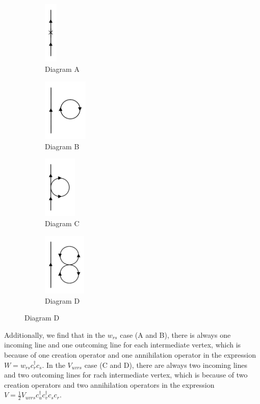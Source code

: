 \begin{figure}[ht]
	\centering
	\begin{subfigure}{0.2\textwidth}
		\centering
		\includegraphics[height=3cm]{figures/diagramA.png}
		\caption{Diagram A}
	\end{subfigure}
	\begin{subfigure}{0.2\textwidth}
		\centering
		\includegraphics[height=3cm]{figures/diagramB.png}
		\caption{Diagram B}
	\end{subfigure}
	\begin{subfigure}{0.2\textwidth}
		\centering
		\includegraphics[height=3cm]{figures/diagramC.png}
		\caption{Diagram C}
	\end{subfigure}
	\begin{subfigure}{0.2\textwidth}
		\centering
		\includegraphics[height=3cm]{figures/diagramD.png}
		\caption{Diagram D}
	\end{subfigure}
\end{figure}

Additionally, we find that in the $w_{rs}$ case (A and B), there is always one incoming line and one outcoming line for each intermediate vertex, which is because of one creation operator and one annihilation operator in the expression $W=w_{rs} c_r^{\dagger} c_s$.
In the $V_{uvrs}$ case (C and D), there are always two incoming lines and two outcoming lines for rach intermediate vertex, which is because of two creation operators and two annihilation operators in the expression $V=\frac{1}{2}V_{uvrs} c_u^{\dagger} c_v^{\dagger} c_s c_r$.

